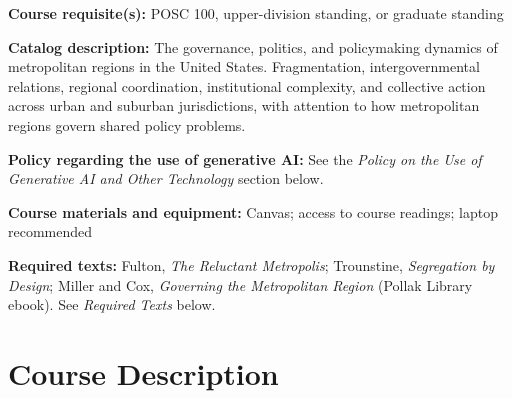\documentclass[12pt]{article}
\begin{document}
\vspace{0.5em}
\begin{flatlist}
\item \textbf{Course requisite(s):} POSC 100, upper-division standing, or graduate standing
\item \textbf{Catalog description:} The governance, politics, and policymaking dynamics of metropolitan regions in the United States. Fragmentation, intergovernmental relations, regional coordination, institutional complexity, and collective action across urban and suburban jurisdictions, with attention to how metropolitan regions govern shared policy problems.
\item \textbf{Policy regarding the use of generative AI:} See the \emph{Policy on the Use of Generative AI and Other Technology} section below.
\item \textbf{Course materials and equipment:} Canvas; access to course readings; laptop recommended
\item \textbf{Required texts:} Fulton, \emph{The Reluctant Metropolis}; Trounstine, \emph{Segregation by Design}; Miller and Cox, \emph{Governing the Metropolitan Region} (Pollak Library ebook). See \emph{Required Texts} below.
\end{flatlist}

\section*{Course Description}
\end{document}
